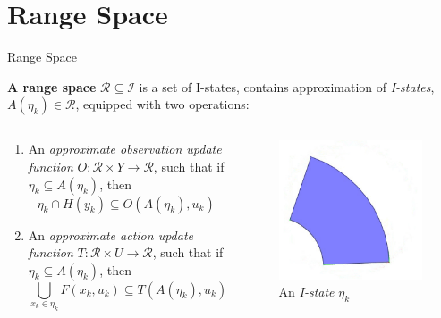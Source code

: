 \section[Range Space]{Range Space}
\begin{frame}{Range Space}
  \begin{definition}{\textbf{A range space}}
    $\mathcal{R} \subseteq \mathcal{I}$ is a set of I-states, contains
    approximation of \emph{I-states}, $A(\eta_k) \in \mathcal{R}$, equipped with
    two operations:
  \end{definition}
  \begin{columns}
    \begin{column}{.5\textwidth}
      \begin{enumerate}
      \item An \emph{approximate observation update function} $O: \mathcal{R} \times
        Y \to \mathcal{R}$, such that if $\eta_k \subseteq A(\eta_k)$, then
        $$\eta_k \cap H(y_k) \subseteq O(A(\eta_k), u_k)$$
      \item An \emph{approximate action update function} $T: \mathcal{R} \times U \to
        \mathcal{R}$, such that if $\eta_k \subseteq A(\eta_k)$, then
        $$\bigcup_{x_k \in \eta_k} F(x_k, u_k) \subseteq T(A(\eta_k), u_k)$$
      \end{enumerate}
    \end{column}
    \begin{column}{.4\textwidth}
    \begin{figure}
      \includegraphics[scale=0.3]{figs/norangespace.jpg}
      \caption{An \emph{I-state} $\eta_k$}
    \end{figure}
  \end{column}
\end{columns}
\end{frame}

